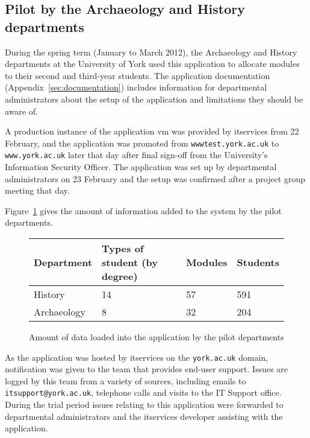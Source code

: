 
\subsection{Pilot by the Archaeology and History departments}

During the spring term (January to March 2012), the Archaeology and History
departments at the University of York used this application to allocate
modules to their second and third-year students. The application documentation
(Appendix~\ref{sec:documentation}) includes information for departmental
administrators about the setup of the application and limitations they should
be aware of.

A production instance of the application \gls{vm} was provided by
\gls{itservices} from 22 February, and the application was promoted from
\texttt{wwwtest.york.ac.uk} to \texttt{www.york.ac.uk} later that day after
final sign-off from the University's Information Security Officer. The
application was set up by departmental administrators on 23 February and the
setup was confirmed after a project group meeting that day.

Figure~\ref{development_pilot_department_numbers} gives the amount of
information added to the system by the pilot departments.

\begin{figure}
  \begin{center}
    \begin{tabular}{ | l | l | l | l | }
      \hline
      \textbf{Department}  & \textbf{Types of student (by degree)} & \textbf{Modules} & \textbf{Students} \\
      \hline
      History     & 14                           & 57      & 591      \\
      Archaeology & 8                            & 32      & 204      \\
      \hline
    \end{tabular}
  \end{center}
  \caption{Amount of data loaded into the application by the pilot departments}
  \label{development_pilot_department_numbers}
\end{figure}

As the application was hosted by \gls{itservices} on the \texttt{york.ac.uk}
domain, notification was given to the team that provides end-user support.
Issues are logged by this team from a variety of sources, including emails to
\texttt{itsupport@york.ac.uk}, telephone calls and visits to the IT Support
office. During the trial period issues relating to this application were
forwarded to departmental administrators and the \gls{itservices} developer
assisting with the application.


